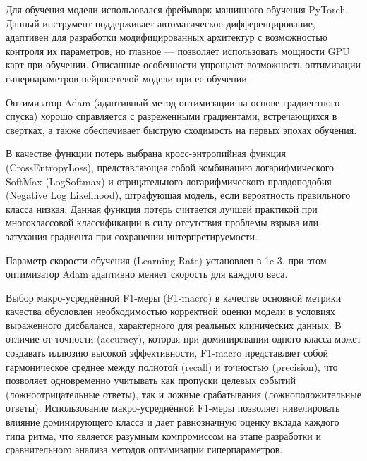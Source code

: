 \documentclass[11pt, oneside, a4paper]{article}
\begin{document}
Для обучения модели использовался фреймворк машинного обучения PyTorch. Данный инструмент поддерживает автоматическое дифференцирование, адаптивен для разработки модифицированных архитектур с возможностью контроля их параметров, но главное --- позволяет использовать мощности GPU карт при обучении. Описанные особенности упрощают возможность оптимизации гиперпараметров нейросетевой модели при ее обучении.

Оптимизатор Adam (адаптивный метод оптимизации на основе градиентного спуска) хорошо справляется с разреженными градиентами, встречающихся в свертках, а также обеспечивает быструю сходимость на первых эпохах обучения.

В качестве функции потерь выбрана кросс-энтропийная функция (CrossEntropyLoss), представляющая собой комбинацию логарифмического SoftMax (LogSoftmax) и отрицательного логарифмического правдоподобия (Negative Log Likelihood), штрафующая модель, если вероятность правильного класса низкая. Данная функция потерь считается лучшей практикой при многоклассовой классификации в силу отсутствия проблемы взрыва или затухания градиента при сохранении интерпретируемости.

Параметр скорости обучения (Learning Rate) установлен в 1e-3, при этом оптимизатор Adam адаптивно меняет скорость для каждого веса. 





Выбор макро-усреднённой F1-меры (F1-macro) в качестве основной метрики качества обусловлен необходимостью корректной оценки модели в условиях выраженного дисбаланса, характерного для реальных клинических данных. В отличие от точности (accuracy), которая при доминировании одного класса может создавать иллюзию высокой эффективности, F1-macro представляет собой гармоническое среднее между полнотой (recall) и точностью (precision), что позволяет одновременно учитывать как пропуски целевых событий (ложноотрицательные ответы), так и ложные срабатывания (ложноположительные ответы). Использование макро-усреднённой F1-меры позволяет нивелировать влияние доминирующего класса и дает равнозначную оценку вклада каждого типа ритма, что является разумным компромиссом на этапе разработки и сравнительного анализа методов оптимизации гиперпараметров. 

\end{document}
